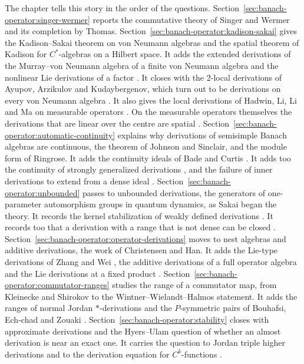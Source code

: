 The chapter tells this story in the order of the questions.
Section~\ref{sec:banach-operator:singer-wermer} reports the commutative
theory of Singer and Wermer and its completion by Thomas.
Section~\ref{sec:banach-operator:kadison-sakai} gives the Kadison--Sakai
theorem on von Neumann algebras and the spatial theorem of Kadison for
$C^*$-algebras on a Hilbert space. It adds the extended derivations of the
Murray--von Neumann algebra of a finite von Neumann algebra
\cite[Theorem~5, p.~2090]{KadisonLiu2014Murray} and the nonlinear Lie
derivations of a factor \cite[Theorem~2.1, p.~1980]{YuZhang2012StarLie}. It
closes with the 2-local derivations
of Ayupov, Arzikulov and Kudaybergenov, which turn out to be derivations on
every von Neumann algebra \cite[Theorem~5, p.~7]{AyupovArzikulov2011TwoLocal}.
It also gives the local derivations of Hadwin, Li, Li and Ma on measurable
operators \cite[Theorem~1, p.~2]{HadwinLiLiMa2013}. On the measurable
operators themselves the derivations that are linear over the centre are
spatial \cite[Theorem~3.9, p.~11]{AlbeverioAyupovKudaybergenov2007}.
Section~\ref{sec:banach-operator:automatic-continuity} explains why
derivations of semisimple Banach algebras are continuous, the theorem of
Johnson and Sinclair, and the module form of Ringrose. It adds the
continuity ideals of Bade and Curtis
\cite[Corollary~2.8, p.~379]{BadeCurtis1974}. It adds too the continuity of
strongly generalized derivations
\cite[Theorem~2.7, p.~5]{HosseiniPark2023}, and the failure of inner
derivations to extend from a dense ideal
\cite[Theorem~4.1, p.~3]{ShafieaslTavakkoli2026}.
Section~\ref{sec:banach-operator:unbounded} passes to unbounded
derivations, the generators of one-parameter automorphism groups in quantum
dynamics, as Sakai began the theory. It records the kernel
stabilization of weakly defined derivations
\cite[Theorem~3.5, p.~7]{Ismert2018Kernel}. It records too that a derivation
with a range that is not dense can be closed
\cite[Theorem~1, p.~181]{Niknam1983Closable}.
Section~\ref{sec:banach-operator:operator-derivations} moves to nest
algebras and additive derivations, the work of Christensen and Han. It adds
the Lie-type derivations of Zhang and Wei
\cite[Theorem~3.1, p.~6]{ZhangWei2017}, the additive derivations of a full
operator algebra \cite[Theorem~2.3, p.~236]{Semrl1991Additive} and the Lie
derivations at a fixed product \cite[Theorem~2.2, p.~3]{LiuHou2025Lie}.
Section~\ref{sec:banach-operator:commutator-ranges} studies the range of a
commutator map, from Kleinecke and Shirokov to the
Wintner--Wielandt--Halmos statement. It adds the ranges of normal Jordan
$*$-derivations \cite[Theorem~1, p.~692]{Molnar1994Range} and the
$P$-symmetric pairs of Bouhafsi, Ech-chad and Zouaki
\cite[Theorem~3.4, p.~149]{BouhafsiEchChadZouaki2022}.
Section~\ref{sec:banach-operator:stability} closes with approximate
derivations and the Hyers--Ulam question of whether an almost derivation is
near an exact one. It carries the question to Jordan triple higher
derivations \cite[Theorem~2.6, p.~1983]{RohJungChang2009Triple} and to the
derivation equation for $C^k$-functions
\cite[Theorem~1, p.~407]{KonigMilman2014Derivation}.

